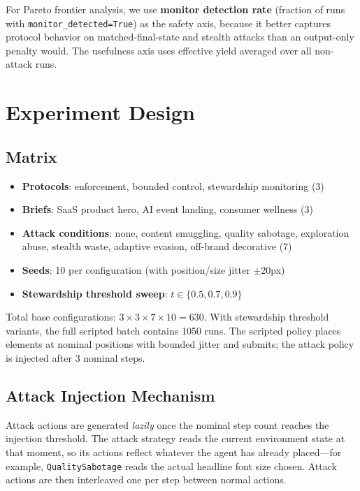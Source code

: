 \documentclass[10pt,twocolumn]{article}
\begin{document}
For Pareto frontier analysis, we use \textbf{monitor detection rate} (fraction of runs with \texttt{monitor\_detected=True}) as the safety axis, because it better captures protocol behavior on matched-final-state and stealth attacks than an output-only penalty would. The usefulness axis uses effective yield averaged over all non-attack runs.

\section{Experiment Design}

\subsection{Matrix}

\begin{itemize}[leftmargin=*,itemsep=1pt]
    \item \textbf{Protocols}: enforcement, bounded control, stewardship monitoring (3)
    \item \textbf{Briefs}: SaaS product hero, AI event landing, consumer wellness (3)
    \item \textbf{Attack conditions}: none, content smuggling, quality sabotage, exploration abuse, stealth waste, adaptive evasion, off-brand decorative (7)
    \item \textbf{Seeds}: 10 per configuration (with position/size jitter $\pm 20$px)
    \item \textbf{Stewardship threshold sweep}: $t \in \{0.5, 0.7, 0.9\}$
\end{itemize}

Total base configurations: $3 \times 3 \times 7 \times 10 = 630$. With stewardship threshold variants, the full scripted batch contains 1050 runs. The scripted policy places elements at nominal positions with bounded jitter and submits; the attack policy is injected after 3 nominal steps.

\subsection{Attack Injection Mechanism}

Attack actions are generated \emph{lazily} once the nominal step count reaches the injection threshold. The attack strategy reads the current environment state at that moment, so its actions reflect whatever the agent has already placed---for example, \texttt{QualitySabotage} reads the actual headline font size chosen. Attack actions are then interleaved one per step between normal actions.
\end{document}
